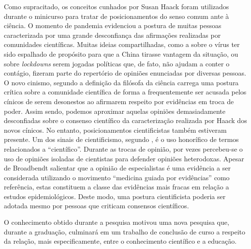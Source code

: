 \documentclass[12pt]{report}
\begin{document}
	Como supracitado, os conceitos cunhados por Susan Haack foram utilizados durante o minicurso para tratar de posicionamentos do senso comum ante à ciência.
	O momento de pandemia evidenciou a postura de muitas pessoas caracterizada por uma grande desconfiança das afirmações realizadas por comunidades científicas.
	Muitas ideias compartilhadas, como a sobre o vírus ter sido espalhado de propósito para que a China tirasse vantagem da situação, ou sobre \textit{lockdowns} serem jogadas políticas que, de fato, não ajudam a conter o contágio, fizeram parte do repertório de opiniões enunciadas por diversas pessoas.
	O novo cinismo, segundo a definição da filósofa da ciência carrega uma postura crítica sobre a comunidade científica de forma a frequentemente ser acusada pelos cínicos de serem desonestos ao afirmarem respeito por evidências em troca de poder.
	Assim sendo, podemos aproximar aquelas opiniões demasiadamente desconfiadas sobre o consenso científico da caracterização realizada por Haack dos novos cínicos.
	No entanto, posicionamentos cientificistas também estiveram presente.
	Um dos sinais de cientificismo, segundo \textcite{haack-six-signs}, é o uso honorífico de termos relacionados a ``científico''.
	Durante as trocas de opinião, por vezes percebeu-se o uso de opiniões isoladas de cientistas para defender opiniões heterodoxas.
	Apesar de Broadbendt salientar que a opinião de especialistas é uma evidência a ser considerada utilizando o movimento ``medicina guiada por evidências'' como referência, estas constituem a classe das evidências mais fracas em relação a estudos epidemiológicos.
	Deste modo, uma postura cientificista poderia ser adotada mesmo por pessoas que criticam consensos científicos.
	
	O conhecimento obtido durante a pesquisa motivou uma nova pesquisa que, durante a graduação, culminará em um trabalho de conclusão de curso a respeito da relação, mais especificamente, entre o conhecimento científico e a educação.
	
	\newpage
	\vspace*{-3cm}
	\printbibliography
	
\end{document}
